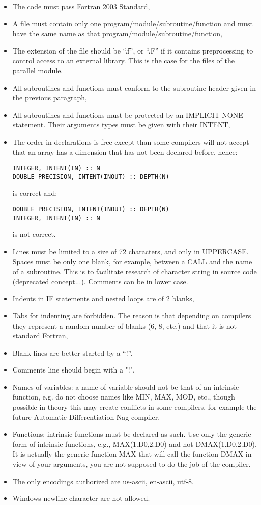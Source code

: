 \begin{itemize}
\item The code must pass Fortran 2003 Standard,
\item A file must contain only one program/module/subroutine/function and must
have the same name as that program/module/subroutine/function,
\item The extension of the file should be ``.f'', or ``.F'' if it contains
  preprocessing to control access to an external library. This is the case for
  the files of the parallel module.
\item All subroutines and functions must conform to the subroutine header given
in the previous paragraph,
\item All subroutines and functions must be protected by an IMPLICIT NONE
statement. Their arguments types must be given with their INTENT,
\item The order in declarations is free except than some compilers will not
accept that an array has a dimension that has not been declared before, hence:
\begin{lstlisting}
INTEGER, INTENT(IN) :: N
DOUBLE PRECISION, INTENT(INOUT) :: DEPTH(N)
\end{lstlisting}
is correct and:
\begin{lstlisting}
DOUBLE PRECISION, INTENT(INOUT) :: DEPTH(N)
INTEGER, INTENT(IN) :: N
\end{lstlisting}
is not correct.
\item Lines must be limited to a size of 72 characters, and only in UPPERCASE.
  Spaces must be only one blank, for example, between a CALL and the name of a
  subroutine. This is to facilitate research of character string in source
  code (deprecated concept...). Comments can be in lower case.
\item Indents in IF statements and nested loops are of 2 blanks,
\item Tabs for indenting are forbidden. The reason is that depending on
compilers they represent a random number of blanks (6, 8, etc.) and that it is
not standard Fortran,
\item Blank lines are better started by a “!”.
\item Comments line should begin with a "!".
\item Names of variables: a name of variable should not be that of an intrinsic
function, e.g. do not choose names like MIN, MAX, MOD, etc., though possible in
theory this may create conflicts in some compilers, for example the future
Automatic Differentiation Nag compiler.
\item Functions: intrinsic functions must be declared as such. Use only the
generic form of intrinsic functions, e.g., MAX(1.D0,2.D0) and not
DMAX(1.D0,2.D0). It is actually the generic function MAX that will call the
function DMAX in view of your arguments, you are not supposed to do the job of
the compiler.
\item The only encodings authorized are us-ascii, en-ascii, utf-8.
\item Windows newline character are not allowed.
\end{itemize}

